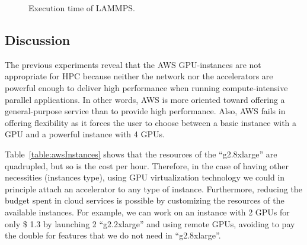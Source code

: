 \documentclass[a4paper,twoside]{article}
\begin{document}
\begin{figure}[htb]
\centering
{}
\quad
{}
\caption{Execution time of LAMMPS.}
\label{fig:lammps}
\end{figure}

\subsection{Discussion}
The previous experiments reveal that the AWS GPU-instances are not appropriate for HPC
because neither the network nor the accelerators are powerful enough to deliver high performance
when running compute-intensive parallel applications. 
In other words, AWS is more oriented toward offering a general-purpose service than to provide high performance.
Also, AWS fails in offering flexibility as it forces the user to choose between a basic instance with a GPU and a powerful instance with 4 GPUs.

Table~\ref{table:awsInstances} shows that the resources of the ``g2.8xlarge'' are quadrupled, but so is the cost per hour.
Therefore, in the case of having other necessities (instances type), using GPU virtualization technology we could in principle attach an accelerator to any type of instance.
Furthermore, reducing the budget spent in cloud services is possible by customizing the resources of the available instances.
For example, we can work on an instance with 2 GPUs for only \$ 1.3 by launching 2 ``g2.2xlarge'' and using remote GPUs, avoiding to pay the double for features that we do not need in ``g2.8xlarge''.
\end{document}
